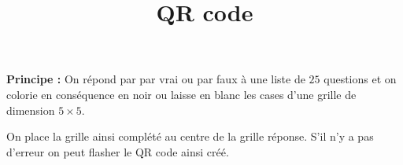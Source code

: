 \documentclass[10pt]{article}
\title{QR code}
\date{}
\begin{document}
\maketitle


\textbf{Principe :} On répond par par vrai ou par faux à une liste de $25$ questions et on colorie en conséquence en noir ou laisse en blanc les cases d'une grille de dimension $5 \times 5$. 


On place la grille ainsi complété au centre de la grille réponse. S'il n'y a pas d'erreur on peut flasher le QR code ainsi créé.
\end{document}
